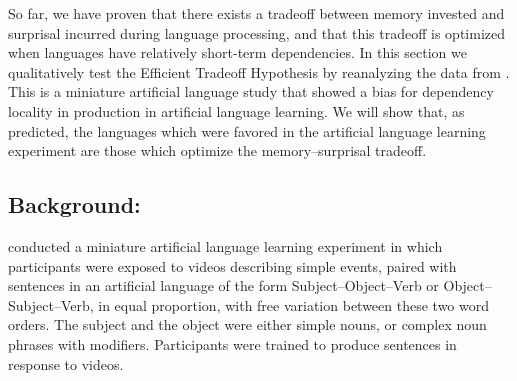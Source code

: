 So far, we have proven that there exists a tradeoff between memory invested and surprisal incurred during language processing, and that this tradeoff is optimized when languages have relatively short-term dependencies. In this section we qualitatively test the Efficient Tradeoff Hypothesis by reanalyzing the data from \cite{fedzechkina-human-2017}.
This is a miniature artificial language study that showed a bias for dependency locality in production in artificial language learning. 
We will show that, as predicted, the languages which were favored in the artificial language learning experiment are those which optimize the memory--surprisal tradeoff. 

\subsection{Background: \citet{fedzechkina-human-2017}}

\citet{fedzechkina-human-2017} conducted a miniature artificial language learning experiment in which participants were exposed to videos describing simple events, paired with sentences in an artificial language of the form Subject--Object--Verb or Object--Subject--Verb, in equal proportion, with free variation between these two word orders. The subject and the object were either simple nouns, or complex noun phrases with modifiers. Participants were trained to produce sentences in response to videos.

